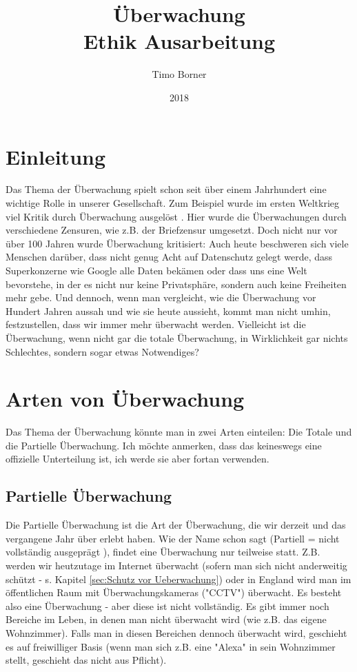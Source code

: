 \documentclass{article}
\title{Überwachung \\ Ethik Ausarbeitung}
\author{Timo Borner}
\date{2018}
\begin{document}
\maketitle
\newpage
\tableofcontents
\newpage

\section{Einleitung}
Das Thema der Überwachung spielt schon seit über einem Jahrhundert eine wichtige Rolle in unserer Gesellschaft. Zum Beispiel wurde im ersten Weltkrieg viel Kritik durch Überwachung ausgelöst \autocite{Pressefreiheit}.
Hier wurde die Überwachungen durch verschiedene Zensuren, wie z.B. der Briefzensur \autocite{Zensur} umgesetzt. Doch nicht nur vor über 100 Jahren wurde Überwachung kritisiert: Auch heute beschweren sich viele Menschen darüber, dass nicht genug Acht auf Datenschutz gelegt werde, dass Superkonzerne wie Google alle Daten bekämen oder dass uns eine Welt bevorstehe, in der es nicht nur keine Privatsphäre, sondern auch keine Freiheiten mehr gebe. Und dennoch, wenn man vergleicht, wie die Überwachung vor Hundert Jahren aussah und wie sie heute aussieht, kommt man nicht umhin, festzustellen, dass wir immer mehr überwacht werden. Vielleicht ist die Überwachung, wenn nicht gar die totale Überwachung, in Wirklichkeit gar nichts Schlechtes, sondern sogar etwas Notwendiges?

\section{Arten von Überwachung}
Das Thema der Überwachung könnte man in zwei Arten einteilen: Die Totale und die Partielle Überwachung. Ich möchte anmerken, dass das keineswegs eine offizielle Unterteilung ist, ich werde sie aber fortan verwenden.

\subsection{Partielle Überwachung}
Die Partielle Überwachung ist die Art der Überwachung, die wir derzeit und das vergangene Jahr über erlebt haben. Wie der Name schon sagt (Partiell = nicht vollständig ausgeprägt \autocite{Partiell}), findet eine Überwachung nur teilweise statt. Z.B. werden wir heutzutage im Internet überwacht (sofern man sich nicht anderweitig schützt - s. Kapitel \ref{sec:Schutz vor Ueberwachung}) oder in England wird man im öffentlichen Raum mit Überwachungskameras ("CCTV") überwacht. Es besteht also eine Überwachung - aber diese ist nicht vollständig. Es gibt immer noch Bereiche im Leben, in denen man nicht überwacht wird (wie z.B. das eigene Wohnzimmer). Falls man in diesen Bereichen dennoch überwacht wird, geschieht es auf freiwilliger Basis (wenn man sich z.B. eine "Alexa" in sein Wohnzimmer stellt, geschieht das nicht aus Pflicht).
\end{document}

